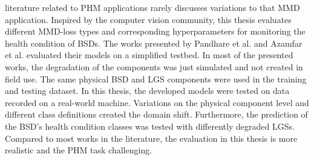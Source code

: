 literature related to PHM applications rarely discusses variations to that MMD application. Inspired by the computer vision community, this thesis evaluates different MMD-loss types and corresponding hyperparameters for monitoring the health condition of BSDs. The works presented by Pandhare et al. \cite{Pandhare2021} and Azamfar et al. \cite{AZAMFAR2020103932} evaluated their models on a simplified testbed. In most of the presented works, the degradation of the components was just simulated and not created in field use. The same physical BSD and LGS components were used in the training and testing dataset. In this thesis, the developed models were tested on data recorded on a real-world machine. Variations on the physical component level and different class definitions created the domain shift. Furthermore, the prediction of the BSD's health condition classes was tested with differently degraded LGSs. Compared to most works in the literature, the evaluation in this thesis is more realistic and the PHM task challenging. 

